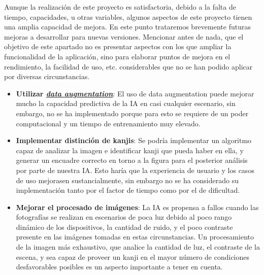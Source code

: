 \documentclass{article}
\begin{document}
Aunque la realización de este proyecto es satisfactoria, debido a la falta de tiempo, capacidades, u otras variables, algunos aspectos de este proyecto tienen una amplia capacidad de mejora. En este punto trataremos brevemente futuras mejoras a desarrollar para nuevas versiones. Mencionar antes de nada, que el objetivo de este apartado no es presentar aspectos con los que ampliar la funcionalidad de la aplicación, sino para elaborar puntos de mejora en el rendimiento, la facilidad de uso, etc. considerables que no se han podido aplicar por diversas circunstancias.

\begin{itemize}
	\item \textbf{Utilizar \hyperref[sec:terms]{\textit{data augmentation}\tec}}: El uso de data augmentation puede mejorar mucho la capacidad predictiva de la IA en casi cualquier escenario, sin embargo, no se ha implementado porque para esto se requiere de un poder computacional y un tiempo de entrenamiento muy elevado.
	\item \textbf{Implementar distinción de kanjis}: Se podría implementar un algoritmo capaz de analizar la imagen e identificar kanji que pueda haber en ella, y generar un encuadre correcto en torno a la figura para el posterior análisis por parte de nuestra IA. Esto haría que la experiencia de usuario y los casos de uso mejorasen sustancialmente, sin embargo no se ha considerado su implementación tanto por el factor de tiempo como por el de dificultad.

	\item \textbf{Mejorar el procesado de imágenes}: La IA es propensa a fallos cuando las fotografías se realizan en escenarios de poca luz debido al poco rango dinámico de los dispositivos, la cantidad de ruido, y el poco contraste presente en las imágenes tomadas en estas circunstancias. Un procesamiento de la imagen más exhaustivo, que analice la cantidad de luz, el contraste de la escena, y sea capaz de proveer un kanji en el mayor número de condiciones desfavorables posibles es un aspecto importante a tener en cuenta.

\end{itemize}
\end{document}
